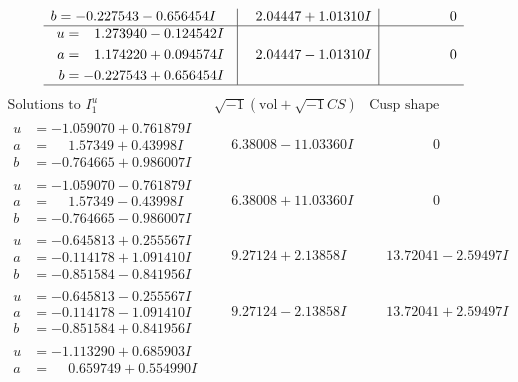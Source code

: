\documentclass[1p]{elsarticle_modified}
\theoremstyle{definition}
\newcommand{\I}{\sqrt{-1}}
\begin{document}
$$\begin{array}{c|c|c}
\begin{aligned}
b &= -0.227543 - 0.656454 I\end{aligned}
 & \phantom{-}2.04447 + 1.01310 I & \phantom{-0.000000 } 0 \\ \hline\begin{aligned}
u &= \phantom{-}1.273940 - 0.124542 I \\
a &= \phantom{-}1.174220 + 0.094574 I \\
b &= -0.227543 + 0.656454 I\end{aligned}
 & \phantom{-}2.04447 - 1.01310 I & \phantom{-0.000000 } 0\\
 \hline 
 \end{array}$$\newpage$$\begin{array}{c|c|c}  
\text{Solutions to }I^u_{1}& \I (\text{vol} + \sqrt{-1}CS) & \text{Cusp shape}\\
 \hline 
\begin{aligned}
u &= -1.059070 + 0.761879 I \\
a &= \phantom{-}1.57349 + 0.43998 I \\
b &= -0.764665 + 0.986007 I\end{aligned}
 & \phantom{-}6.38008 - 11.03360 I & \phantom{-0.000000 } 0 \\ \hline\begin{aligned}
u &= -1.059070 - 0.761879 I \\
a &= \phantom{-}1.57349 - 0.43998 I \\
b &= -0.764665 - 0.986007 I\end{aligned}
 & \phantom{-}6.38008 + 11.03360 I & \phantom{-0.000000 } 0 \\ \hline\begin{aligned}
u &= -0.645813 + 0.255567 I \\
a &= -0.114178 + 1.091410 I \\
b &= -0.851584 - 0.841956 I\end{aligned}
 & \phantom{-}9.27124 + 2.13858 I & \phantom{-}13.72041 - 2.59497 I \\ \hline\begin{aligned}
u &= -0.645813 - 0.255567 I \\
a &= -0.114178 - 1.091410 I \\
b &= -0.851584 + 0.841956 I\end{aligned}
 & \phantom{-}9.27124 - 2.13858 I & \phantom{-}13.72041 + 2.59497 I \\ \hline\begin{aligned}
u &= -1.113290 + 0.685903 I \\
a &= \phantom{-}0.659749 + 0.554990 I \\

\end{aligned}
\end{array}$$
\end{document}
